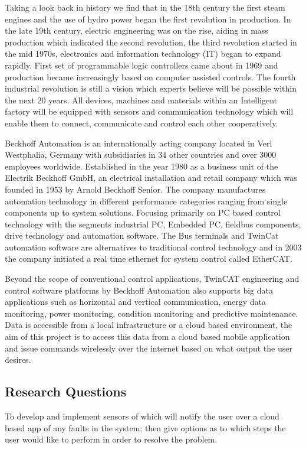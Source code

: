 \documentclass[a4paper, 10pt, conference]{IEEEconf}
\begin{document}
Taking a look back in history we find that in the 18th century the first steam engines and the use of hydro power began the first revolution in production. In the late 19th century, electric engineering was on the rise, aiding in mass production which indicated the second revolution, the third revolution started in the mid 1970s, electronics and information technology (IT) began to expand rapidly. First set of programmable logic controllers came about in 1969 and production became increasingly based on computer assisted controls. The fourth industrial revolution is still a vision which experts believe will be possible within the next 20 years. All devices, machines and materials within an Intelligent factory will be equipped with sensors and communication technology which will enable them to connect, communicate and control each other cooperatively. 

Beckhoff Automation is an internationally acting company located in Verl Westphalia, Germany with subsidiaries in 34 other countries and over 3000 employees worldwide. Established in the year 1980 as a business unit of the Electrik Beckhoff GmbH, an electrical installation and retail company which was founded in 1953 by Arnold Beckhoff Senior. The company manufactures automation technology in different performance categories ranging from single components up to system solutions. Focusing primarily on PC based control technology with the segments industrial PC, Embedded PC, fieldbus components, drive technology and automation software. The Bus terminals and TwinCat automation software are alternatives to traditional control technology and in 2003 the company initiated a real time ethernet for system control called EtherCAT. 

Beyond the scope of conventional control applications, TwinCAT engineering and control software platforms by Beckhoff Automation also supports big data applications such as horizontal and vertical communication, energy data monitoring, power monitoring, condition monitoring and predictive maintenance. Data is accessible from a local infrastructure or a cloud based environment, the aim of this project is to access this data from a cloud based mobile application and issue commands wirelessly over the internet based on what output the user desires.

\subsection{Research Questions}
To develop and implement sensors of which will notify the user over a cloud based app of any faults in the system; then give options as to which steps the user would like to perform in order to resolve the problem. 
\end{document}
